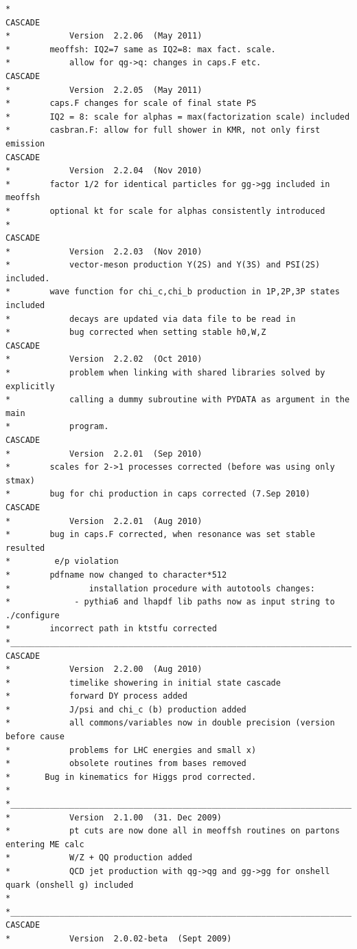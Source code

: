 \documentclass[11pt]{article} \usepackage{mystyle-new}
\begin{document}
\begin{tiny}
\begin{verbatim}
* 
CASCADE 
*            Version  2.2.06  (May 2011)
*		 meoffsh: IQ2=7 same as IQ2=8: max fact. scale.
*            allow for qg->q: changes in caps.F etc.
CASCADE 
*            Version  2.2.05  (May 2011)
* 		 caps.F changes for scale of final state PS
* 		 IQ2 = 8: scale for alphas = max(factorization scale) included
* 		 casbran.F: allow for full shower in KMR, not only first emission
CASCADE 
*            Version  2.2.04  (Nov 2010)
*		 factor 1/2 for identical particles for gg->gg included in meoffsh
* 		 optional kt for scale for alphas consistently introduced
* 		 
CASCADE 
*            Version  2.2.03  (Nov 2010)
*            vector-meson production Y(2S) and Y(3S) and PSI(2S) included.
*		 wave function for chi_c,chi_b production in 1P,2P,3P states included
*            decays are updated via data file to be read in
*            bug corrected when setting stable h0,W,Z
CASCADE 
*            Version  2.2.02  (Oct 2010)
*            problem when linking with shared libraries solved by explicitly	
*            calling a dummy subroutine with PYDATA as argument in the main
*            program.
CASCADE 
*            Version  2.2.01  (Sep 2010)
*		 scales for 2->1 processes corrected (before was using only stmax)
*		 bug for chi production in caps corrected (7.Sep 2010)
CASCADE 
*            Version  2.2.01  (Aug 2010)
*		 bug in caps.F corrected, when resonance was set stable resulted 
* 		  e/p violation
*		 pdfname now changed to character*512
*                installation procedure with autotools changes:
*		      - pythia6 and lhapdf lib paths now as input string to ./configure
*		 incorrect path in ktstfu corrected
*________________________________________________________________________
CASCADE 
*            Version  2.2.00  (Aug 2010)
*            timelike showering in initial state cascade 
*            forward DY process added
*            J/psi and chi_c (b) production added
*            all commons/variables now in double precision (version before cause
*            problems for LHC energies and small x)
*            obsolete routines from bases removed
*	    Bug in kinematics for Higgs prod corrected.
*            
*________________________________________________________________________
*            Version  2.1.00  (31. Dec 2009)
*            pt cuts are now done all in meoffsh routines on partons entering ME calc
*            W/Z + QQ production added
*            QCD jet production with qg->qg and gg->gg for onshell quark (onshell g) included
*		
*________________________________________________________________________
CASCADE 
*            Version  2.0.02-beta  (Sept 2009)

\end{verbatim}
\end{tiny}
\end{document}
